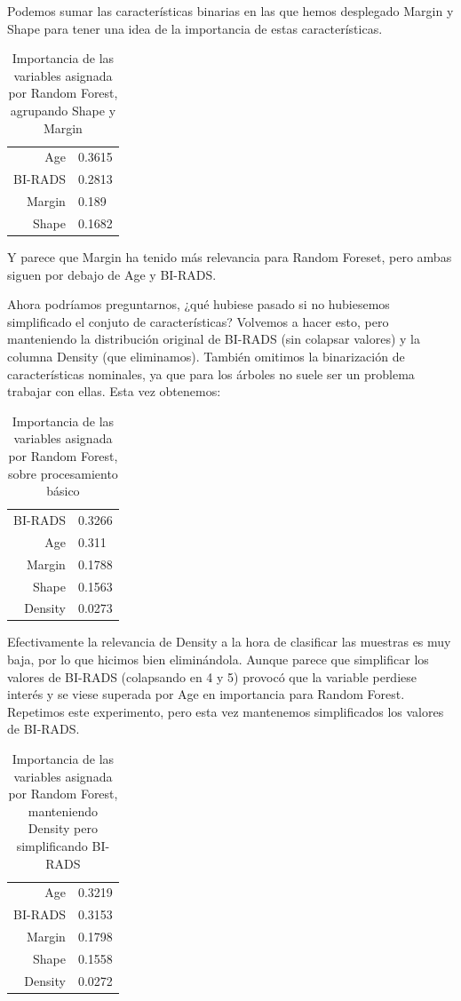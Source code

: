 \documentclass{article}
\begin{document}
Podemos sumar las características binarias en las que hemos desplegado
Margin y Shape para tener una idea de la importancia de estas
características.

\begin{table}[H]
  \centering
  \begin{tabular}{r|l}
    Age & 0.3615 \\
    BI-RADS & 0.2813 \\
    Margin & 0.189 \\
    Shape & 0.1682 \\
  \end{tabular}
  \caption{Importancia de las variables asignada por Random Forest, agrupando Shape y Margin}
  \label{tab:importance2}
\end{table}

Y parece que Margin ha tenido más relevancia para Random Foreset, pero
ambas siguen por debajo de Age y BI-RADS.

Ahora podríamos preguntarnos, ¿qué hubiese pasado si no hubiesemos
simplificado el conjuto de características? Volvemos a hacer esto,
pero manteniendo la distribución original de BI-RADS (sin colapsar
valores) y la columna Density (que eliminamos). También omitimos la
binarización de características nominales, ya que para los árboles no
suele ser un problema trabajar con ellas. Esta vez obtenemos:

\begin{table}[H]
  \centering
  \begin{tabular}{r|l}
    BI-RADS & 0.3266 \\
    Age & 0.311 \\
    Margin & 0.1788 \\
    Shape & 0.1563 \\
    Density & 0.0273 \\
  \end{tabular}
  \caption{Importancia de las variables asignada por Random Forest, sobre procesamiento básico}
  \label{tab:importance3}
\end{table}

Efectivamente la relevancia de Density a la hora de clasificar las
muestras es muy baja, por lo que hicimos bien eliminándola. Aunque
parece que simplificar los valores de BI-RADS (colapsando en 4 y 5)
provocó que la variable perdiese interés y se viese superada por Age
en importancia para Random Forest. Repetimos este experimento, pero
esta vez mantenemos simplificados los valores de BI-RADS.

\begin{table}[H]
  \centering
  \begin{tabular}{r|l}
    Age & 0.3219 \\
    BI-RADS & 0.3153 \\
    Margin & 0.1798 \\
    Shape & 0.1558 \\
    Density & 0.0272 \\
  \end{tabular}
  \caption{Importancia de las variables asignada por Random Forest, manteniendo Density pero simplificando BI-RADS}
  \label{tab:importance4}
\end{table}
\end{document}
